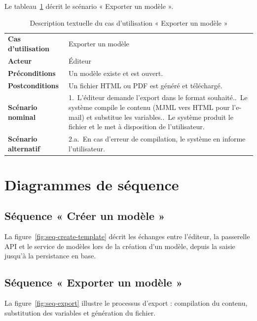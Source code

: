 Le tableau~\ref{tab:uc-export} décrit le scénario « Exporter un modèle ».

\begin{table}[H]
\centering
\caption{Description textuelle du cas d'utilisation « Exporter un modèle »}
\label{tab:uc-export}
\small
\begin{tabularx}{\linewidth}{lX}
\toprule
\textbf{Cas d'utilisation} & Exporter un modèle \\
\textbf{Acteur} & Éditeur \\
\textbf{Préconditions} & Un modèle existe et est ouvert. \\
\textbf{Postconditions} & Un fichier HTML ou PDF est généré et téléchargé. \\
\midrule
\textbf{Scénario nominal} &
1.~L'éditeur demande l'export dans le format souhaité.\newline
2.~Le système compile le contenu (MJML vers HTML pour l'e-mail) et substitue les variables.\newline
3.~Le système produit le fichier et le met à disposition de l'utilisateur. \\
\midrule
\textbf{Scénario alternatif} &
2.a.~En cas d'erreur de compilation, le système en informe l'utilisateur. \\
\bottomrule
\end{tabularx}
\end{table}

\section{Diagrammes de séquence}

\subsection{Séquence « Créer un modèle »}
La figure~\ref{fig:seq-create-template} décrit les échanges entre l'éditeur,
la passerelle API et le service de modèles lors de la création d'un modèle,
depuis la saisie jusqu'à la persistance en base.


\subsection{Séquence « Exporter un modèle »}
La figure~\ref{fig:seq-export} illustre le processus d'export : compilation
du contenu, substitution des variables et génération du fichier.

